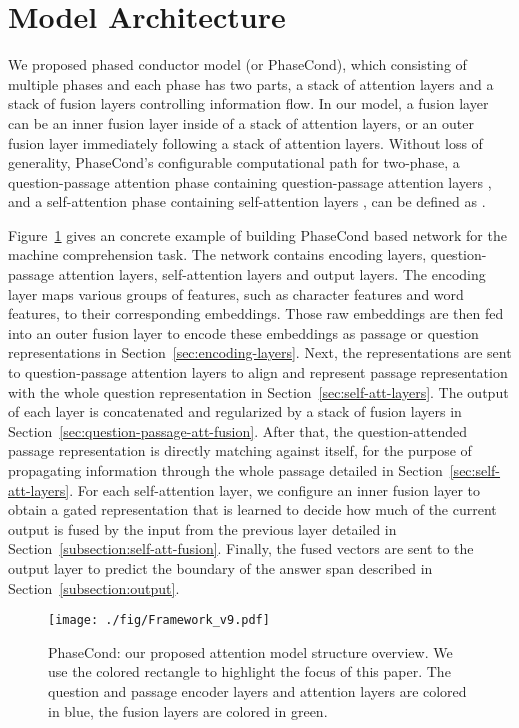 \documentclass{article} \usepackage{arxiv, times}
\begin{document}
\section{Model Architecture} \label{sec:model-arch}
We proposed phased conductor model (or PhaseCond), which consisting of multiple phases and each phase has two parts, a stack of attention layers  and a stack of fusion layers  controlling information flow. In our model, a fusion layer  can be an inner fusion layer  inside of a stack of attention layers, or an outer fusion layer  immediately following a stack of attention layers. Without loss of generality, PhaseCond's configurable computational path for two-phase, a question-passage attention phase containing  question-passage attention layers , and a self-attention phase containing  self-attention layers , can be defined as .

Figure~\ref{fig:framework} gives an concrete example of building PhaseCond based network for the machine comprehension task. The network contains encoding layers, question-passage attention layers, self-attention layers and output layers. The encoding layer maps various groups of features, such as character features and word features, to their corresponding embeddings. Those raw embeddings are then fed into an outer fusion layer to encode these embeddings as passage or question representations in Section~\ref{sec:encoding-layers}. Next, the representations are sent to question-passage attention layers to align and represent passage representation with the whole question representation in Section~\ref{sec:self-att-layers}. The output of each layer is concatenated and regularized by a stack of fusion layers in Section~\ref{sec:question-passage-att-fusion}. After that, the question-attended passage representation is directly matching against itself, for the purpose of propagating information through the whole passage detailed in Section~\ref{sec:self-att-layers}. For each self-attention layer, we configure an inner fusion layer to obtain a gated representation that is learned to decide how much of the current output is fused by the input from the previous layer detailed in Section~\ref{subsection:self-att-fusion}. Finally, the fused vectors are sent to the output layer to predict the boundary of the answer span described in Section~\ref{subsection:output}.

\begin{figure}[t]
    \centering
    \texttt{[image: ./fig/Framework\_v9.pdf]}
    \caption{PhaseCond: our proposed attention model structure overview. We use the colored rectangle to highlight the focus of this paper. The  question and passage encoder layers and attention layers are colored in blue, the fusion layers are colored in green.}
    \label{fig:framework}
\end{figure}
\end{document}
